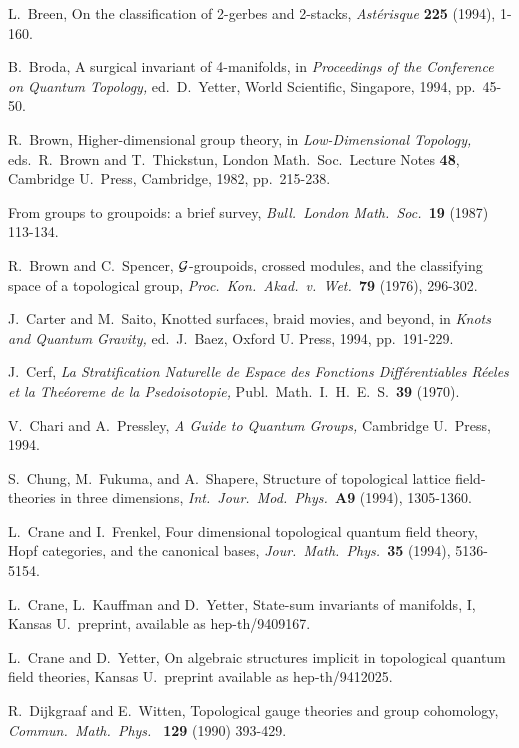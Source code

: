 \begin{thebibliography}{10}
 L.\ Breen, On the classification of 2-gerbes and 2-stacks,
{\sl Ast\'erisque} {\bf 225} (1994), 1-160.

 B.\ Broda, A surgical invariant of 4-manifolds,
in {\sl Proceedings of the Conference on Quantum Topology,} ed.\
D.\ Yetter, World Scientific, Singapore, 1994, pp.\ 45-50.

R.\ Brown, Higher-dimensional group theory, in {\sl
Low-Dimensional Topology,} eds.\ R.\ Brown and T.\ Thickstun,
London Math.\ Soc.\ Lecture Notes {\bf 48}, Cambridge U.\ Press,
Cambridge, 1982, pp.\ 215-238.

{}From groups to groupoids: a brief
survey, {\sl Bull.\ London Math.\ Soc.\ }{\bf 19} (1987) 113-134.

 R.\ Brown and C.\ Spencer, $\cal G$-groupoids, crossed
modules, and the classifying space of a topological group, {\sl Proc.\ Kon.\
Akad.\ v.\ Wet.\ }{\bf 79} (1976), 296-302.

 J.\ Carter and M.\ Saito, Knotted surfaces, braid
movies, and beyond, in {\sl Knots and Quantum Gravity,} ed.\ J.\
Baez, Oxford U. Press, 1994, pp.\ 191-229.

\bibitem{Cerf} J.\ Cerf, {\sl La Stratification Naturelle de
Espace des Fonctions Diff\'erentiables R\'eeles et la The\'eoreme
de la Psedoisotopie,} Publ.\ Math.\ I.\ H.\ E.\ S.\ {\bf 39} (1970).

\bibitem{CP} V.\ Chari and A.\ Pressley, {\sl A Guide to
Quantum Groups,} Cambridge U.\ Press, 1994.

\bibitem{CFS} S.\ Chung, M.\ Fukuma, and A.\ Shapere, Structure
of topological lattice field-theories in three dimensions, {\sl
Int.\ Jour.\ Mod.\ Phys.\ }{\bf A9} (1994), 1305-1360.

\bibitem{CF}  L.\ Crane and I.\ Frenkel,
Four dimensional topological quantum field theory, Hopf categories,
and the canonical bases, {\sl Jour.\ Math.\ Phys.\ }{\bf 35} (1994),
5136-5154.  

\bibitem{CKY} L.\ Crane, L.\ Kauffman and D.\ Yetter,
State-sum invariants of manifolds, I, Kansas U.\ preprint,
available as hep-th/9409167.

\bibitem{CY} L.\ Crane and D.\ Yetter, On algebraic structures
implicit in topological quantum field theories, Kansas U.\ preprint
available as hep-th/9412025.

\bibitem{DW} R.\ Dijkgraaf and E.\ Witten, Topological gauge
theories and group cohomology, {\sl Commun.\ Math.\ Phys.\ }{\bf
129} (1990) 393-429.


\end{thebibliography}

